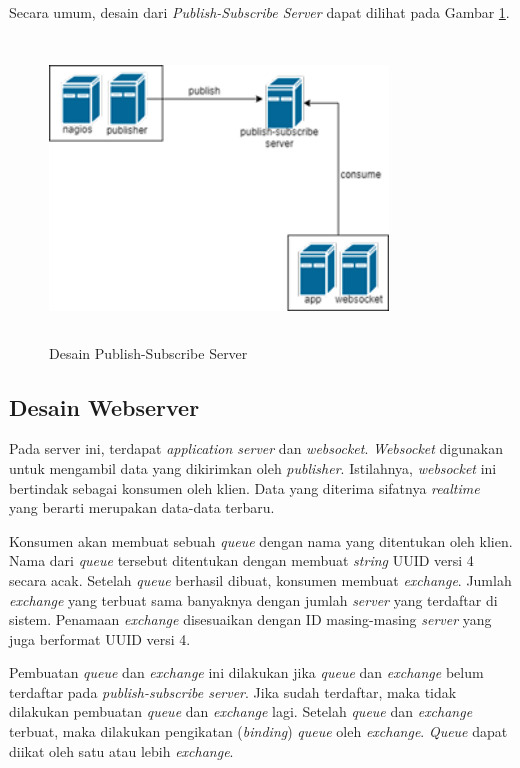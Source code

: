 Secara umum, desain dari \textit{Publish-Subscribe Server} dapat
dilihat pada Gambar \ref{fig:pubsub}.

\begin{figure}[H]
	\centering
	\includegraphics[width=9cm,height=8cm]{assets/images/pubsub.png}
	\caption{Desain Publish-Subscribe Server}
	\label{fig:pubsub}
\end{figure}

\subsection{Desain Webserver}
Pada server ini, terdapat \textit{application server} dan \textit{websocket}. \textit{Websocket} digunakan untuk mengambil data yang dikirimkan oleh \textit{publisher}. Istilahnya, \textit{websocket} ini bertindak sebagai konsumen oleh klien. Data yang diterima sifatnya \textit{realtime} yang berarti merupakan data-data terbaru. 

Konsumen akan membuat sebuah \textit{queue} dengan nama yang ditentukan oleh klien. Nama dari \textit{queue} tersebut ditentukan dengan membuat \textit{string} UUID versi 4 secara acak. Setelah \textit{queue} berhasil dibuat, konsumen membuat \textit{exchange}. Jumlah \textit{exchange} yang terbuat sama banyaknya dengan jumlah \textit{server} yang terdaftar di sistem. Penamaan \textit{exchange} disesuaikan dengan ID masing-masing \textit{server} yang juga berformat UUID versi 4. 

Pembuatan \textit{queue} dan \textit{exchange} ini dilakukan jika \textit{queue} dan \textit{exchange} belum terdaftar pada \textit{publish-subscribe server}. Jika sudah terdaftar, maka tidak dilakukan pembuatan \textit{queue} dan \textit{exchange} lagi. Setelah \textit{queue} dan \textit{exchange} terbuat, maka dilakukan pengikatan (\textit{binding}) \textit{queue} oleh \textit{exchange}. \textit{Queue} dapat diikat oleh satu atau lebih \textit{exchange}. 

